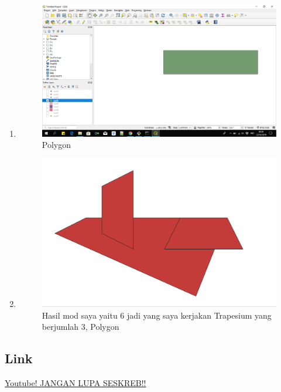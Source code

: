 \begin{enumerate}
	\item 
	
	\begin{figure}[H]
		\includegraphics[width=12cm]{figures/1174038/9.PNG}
		\centering
		\caption{Polygon}
	\end{figure}
	
	\item 
	
	\begin{figure}[H]
		\includegraphics[width=12cm]{figures/1174038/10.PNG}
		\centering
		\caption{Hasil mod saya yaitu 6 jadi yang saya kerjakan Trapesium yang berjumlah 3, Polygon}
	\end{figure}	
\end{enumerate}

\subsection{Link}
\href{https://youtu.be/-kGuJYmKhJY}{Youtube! JANGAN LUPA SESKREB!!}